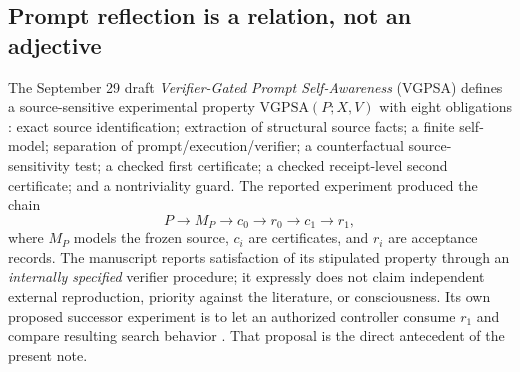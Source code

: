 \documentclass[11pt,letterpaper]{article}
\begin{document}
\subsection{Prompt reflection is a relation, not an adjective}
The September 29 draft \emph{Verifier-Gated Prompt Self-Awareness} (VGPSA) defines a source-sensitive experimental property $\mathrm{VGPSA}(P;X,V)$ with eight obligations \cite{vgpsa}: exact source identification; extraction of structural source facts; a finite self-model; separation of prompt/execution/verifier; a counterfactual source-sensitivity test; a checked first certificate; a checked receipt-level second certificate; and a nontriviality guard. The reported experiment produced the chain
\begin{equation}\label{eq:chain}
 P\longrightarrow M_P\longrightarrow c_0\longrightarrow r_0\longrightarrow c_1\longrightarrow r_1,
\end{equation}
where $M_P$ models the frozen source, $c_i$ are certificates, and $r_i$ are acceptance records. The manuscript reports satisfaction of its stipulated property through an \emph{internally specified} verifier procedure; it expressly does not claim independent external reproduction, priority against the literature, or consciousness. Its own proposed successor experiment is to let an authorized controller consume $r_1$ and compare resulting search behavior \cite[Sec.~12.6]{vgpsa}. That proposal is the direct antecedent of the present note.
\end{document}
